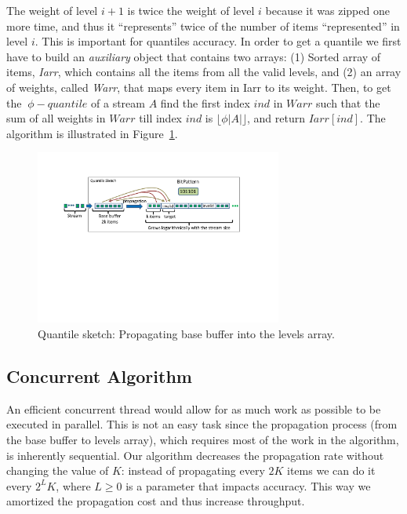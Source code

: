 The weight of level $i+1$ is twice the weight of level
$i$ because it was zipped one more time, and thus it
``represents'' twice of the number of items ``represented'' in
level $i$.
This is important for quantiles accuracy.
In order to get a quantile we first have to build an
\emph{auxiliary} object that contains two arrays:
(1) Sorted array of items, \emph{Iarr}, which 
contains all the items from all the valid levels, and (2) an
array of weights, called \emph{Warr}, that maps every item in
Iarr to its weight.
Then, to get the $~\phi - quantile$ of a stream $A$
find the first index $ind$ in $Warr$ such that the
sum of all weights in $Warr$ till index $ind$ is $\lfloor \phi |A|
\rfloor$, and return $Iarr[ind]$. The algorithm is illustrated in
Figure~\ref{fig:quantilesMerge}.

\begin{figure}[tb]
    \centering
    \includegraphics[width=3.2in]{images/quantilesPropogation.pdf}
    \caption{Quantile sketch: Propagating base buffer
    into the levels array.}
    \label{fig:quantilesMerge}
\end{figure}


\subsection{Concurrent Algorithm}

An efficient concurrent thread would allow for as much work as possible to be executed in parallel.
This is not an easy task since the propagation process (from the base buffer to levels
array), which requires most of the work in the algorithm, is
inherently sequential.
Our algorithm decreases the propagation rate without changing
the value of $K$: instead of propagating every $2K$ items we can
do it every $2^{L}K$, where $L \geq 0$ is a parameter that
impacts accuracy.
This way we amortized the propagation cost and thus increase
throughput.

